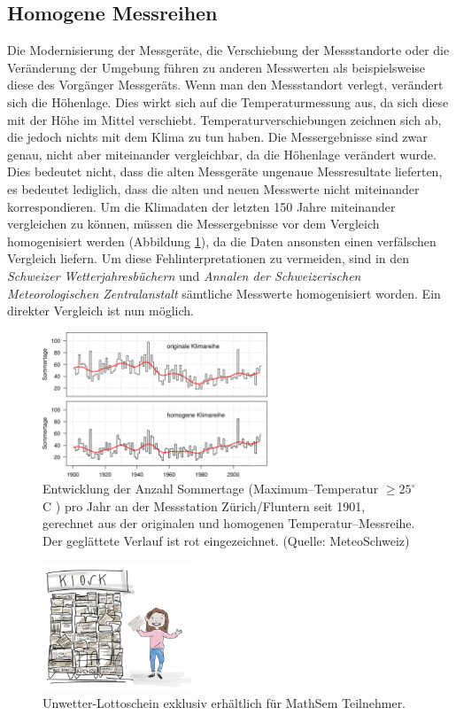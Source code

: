 \begin{refsection}
\subsection{Homogene Messreihen}
Die Modernisierung der Messgeräte, die Verschiebung der Messstandorte oder die Veränderung der Umgebung führen zu anderen Messwerten als beispielsweise diese des Vorgänger Messgeräts. Wenn man den Messstandort verlegt, verändert sich die Höhenlage. Dies wirkt sich auf die Temperaturmessung aus, da sich diese mit der Höhe im Mittel verschiebt. Temperaturverschiebungen zeichnen sich ab, die jedoch nichts mit dem Klima zu tun haben. Die Messergebnisse sind zwar genau, nicht aber miteinander vergleichbar, da die Höhenlage verändert wurde.
Dies bedeutet nicht, dass die alten Messgeräte ungenaue Messresultate lieferten, es bedeutet lediglich, dass die alten und neuen Messwerte nicht miteinander korrespondieren. 
Um die Klimadaten der letzten 150 Jahre miteinander vergleichen zu können, müssen die Messergebnisse vor dem Vergleich homogenisiert werden (Abbildung \ref{Homogen}), da die Daten ansonsten einen verfälschen Vergleich liefern.
Um diese Fehlinterpretationen zu vermeiden, sind in den {\em Schweizer Wetterjahresbüchern} und {\em Annalen der Schweizerischen Meteorologischen Zentralanstalt} sämtliche Messwerte homogenisiert worden. Ein direkter Vergleich ist nun möglich.

\begin{figure}
\centering
\includegraphics[width=0.6\textwidth]{extrem/Homogen.jpg}
\caption{Entwicklung der Anzahl Sommertage (Maximum--Temperatur $\ge 25^{\circ}$C ) pro Jahr an der Messstation Zürich/Fluntern seit 1901, gerechnet aus der originalen und homogenen Temperatur--Messreihe. Der geglättete Verlauf ist rot eingezeichnet. (Quelle: MeteoSchweiz)}
\label{Homogen}
\end{figure}

\begin{figure}
\centering
\includegraphics[width=0.4\textwidth]{extrem/Kiosk.pdf}
\caption{Unwetter-Lottoschein exklusiv erhältlich für MathSem Teilnehmer.}
\label{Kiosk}
\end{figure}



\end{refsection}

